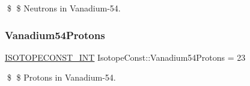 \$ \$ Neutrons in Vanadium-\/54. \mbox{\label{group___isotope_const-_vanadium-_v54_ga96a1e461c56c0c053e5e6a05caad98d5}} 
\subsubsection{\texorpdfstring{Vanadium54\+Protons}{Vanadium54Protons}}
{\footnotesize\ttfamily \mbox{\hyperlink{group___isotope_const-_macros_ga5f18360b3e99483a35c32d789e62621c}{I\+S\+O\+T\+O\+P\+E\+C\+O\+N\+S\+T\+\_\+\+I\+NT}} Isotope\+Const\+::\+Vanadium54\+Protons = 23}

\$ \$ Protons in Vanadium-\/54. 